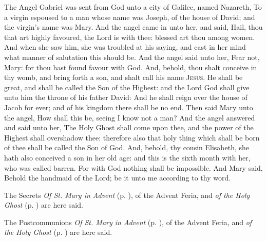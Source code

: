  The Angel Gabriel was sent from God unto a city of Galilee, named Nazareth, To a virgin espoused to a man whose name was Joseph, of the house of David; and the virgin's name was Mary. And the angel came in unto her, and said, Hail, thou that art highly favoured, the Lord is with thee: blessed art thou among women. And when she saw him, she was troubled at his saying, and cast in her mind what manner of salutation this should be. And the angel said unto her, Fear not, Mary: for thou hast found favour with God. And, behold, thou shalt conceive in thy womb, and bring forth a son, and shalt call his name {\textsc{Jesus}}. He shall be great, and shall be called the Son of the Highest: and the Lord God shall give unto him the throne of his father David: And he shall reign over the house of Jacob for ever; and of his kingdom there shall be no end. Then said Mary unto the angel, How shall this be, seeing I know not a man? And the angel answered and said unto her, The Holy Ghost shall come upon thee, and the power of the Highest shall overshadow thee: therefore also that holy thing which shall be born of thee shall be called the Son of God. And, behold, thy cousin Elisabeth, she hath also conceived a son in her old age: and this is the sixth month with her, who was called barren. For with God nothing shall be impossible. And Mary said, Behold the handmaid of the Lord; be it unto me according to thy word.
\begin{rubric}
    The Secrets \emph{Of St. Mary in Advent} (p. \pageref{SPMaryInAdvent}), of the Advent Feria, and \emph{of the Holy Ghost} (p. \pageref{SPHolyGhost}) are here said.
\end{rubric}

\begin{rubric}
    The Postcommunions \emph{Of St. Mary in Advent} (p. \pageref{SPMaryInAdvent}), of the Advent Feria, and \emph{of the Holy Ghost} (p. \pageref{SPHolyGhost}) are here said.
\end{rubric}

